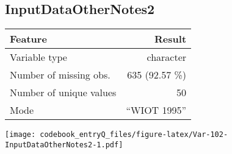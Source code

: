 \documentclass[]{article}
\newcommand{\fullline}{\noindent\makebox[\linewidth]{\rule{\textwidth}{0.4pt}}}
\newcommand{\bminione}{\begin{minipage}{0.75 \textwidth}}
\newcommand{\bminitwo}{\begin{minipage}{0.25 \textwidth}}
\newcommand{\emini}{\end{minipage}}
\begin{document}
\fullline

\hypertarget{inputdataothernotes2}{\subsection{InputDataOtherNotes2}\label{inputdataothernotes2}}

\bminione

\begin{longtable}[]{@{}lr@{}}
\toprule
\begin{minipage}[b]{0.34\columnwidth}\raggedright\strut
Feature\strut
\end{minipage} & \begin{minipage}[b]{0.20\columnwidth}\raggedleft\strut
Result\strut
\end{minipage}\tabularnewline
\midrule
\endhead
\begin{minipage}[t]{0.34\columnwidth}\raggedright\strut
Variable type\strut
\end{minipage} & \begin{minipage}[t]{0.20\columnwidth}\raggedleft\strut
character\strut
\end{minipage}\tabularnewline
\begin{minipage}[t]{0.34\columnwidth}\raggedright\strut
Number of missing obs.\strut
\end{minipage} & \begin{minipage}[t]{0.20\columnwidth}\raggedleft\strut
635 (92.57 \%)\strut
\end{minipage}\tabularnewline
\begin{minipage}[t]{0.34\columnwidth}\raggedright\strut
Number of unique values\strut
\end{minipage} & \begin{minipage}[t]{0.20\columnwidth}\raggedleft\strut
50\strut
\end{minipage}\tabularnewline
\begin{minipage}[t]{0.34\columnwidth}\raggedright\strut
Mode\strut
\end{minipage} & \begin{minipage}[t]{0.20\columnwidth}\raggedleft\strut
``WIOT 1995''\strut
\end{minipage}\tabularnewline
\bottomrule
\end{longtable}

\emini
\bminitwo
\texttt{[image: codebook\_entryQ\_files/figure-latex/Var-102-InputDataOtherNotes2-1.pdf]}
\emini
\end{document}
